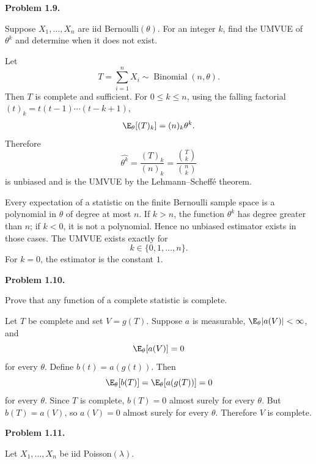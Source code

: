 \documentclass[answers,12pt,addpoints]{exam}
\begin{document}
\begin{questions}
\question[0] \textbf{Problem 1.9.}

Suppose $X_1,\ldots,X_n$ are iid Bernoulli$(\theta)$. For an integer $k$, find the
UMVUE of $\theta^k$ and determine when it does not exist.

\begin{solution}
Let
\[
T=\sum_{i=1}^nX_i\sim\operatorname{Binomial}(n,\theta).
\]
Then $T$ is complete and sufficient. For $0\le k\le n$, using the falling factorial
$(t)_k=t(t-1)\cdots(t-k+1)$,
\[
\E_\theta[(T)_k]=(n)_k\theta^k.
\]
Therefore
\[
\widehat{\theta^k}
=\frac{(T)_k}{(n)_k}
=\frac{\binom{T}{k}}{\binom{n}{k}}
\]
is unbiased and is the UMVUE by the Lehmann--Scheff\'e theorem.

Every expectation of a statistic on the finite Bernoulli sample space is a polynomial
in $\theta$ of degree at most $n$. If $k>n$, the function $\theta^k$ has degree greater
than $n$; if $k<0$, it is not a polynomial. Hence no unbiased estimator exists in
those cases. The UMVUE exists exactly for
\[
k\in\{0,1,\ldots,n\}.
\]
For $k=0$, the estimator is the constant $1$.
\end{solution}

\question[0] \textbf{Problem 1.10.}

Prove that any function of a complete statistic is complete.

\begin{solution}
Let $T$ be complete and set $V=g(T)$. Suppose $a$ is measurable,
$\E_\theta|a(V)|<\infty$, and
\[
\E_\theta[a(V)]=0
\]
for every $\theta$. Define $b(t)=a(g(t))$. Then
\[
\E_\theta[b(T)]=\E_\theta[a(g(T))]=0
\]
for every $\theta$. Since $T$ is complete, $b(T)=0$ almost surely for every $\theta$.
But $b(T)=a(V)$, so $a(V)=0$ almost surely for every $\theta$. Therefore $V$ is
complete.
\end{solution}

\question[0] \textbf{Problem 1.11.}

Let $X_1,\ldots,X_n$ be iid Poisson$(\lambda)$.


\end{questions}
\end{document}
